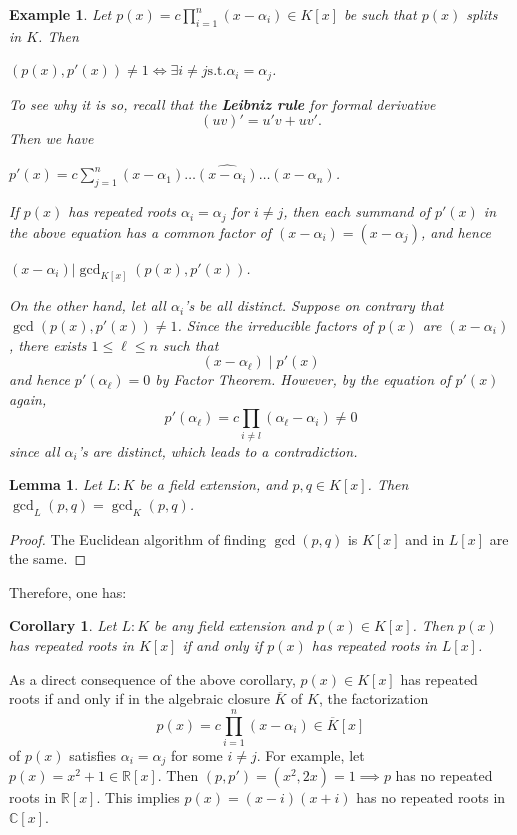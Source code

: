 \documentclass[11pt]{book}
\newtheorem{corollary}[theorem]{Corollary}
\newtheorem{example}[theorem]{Example}
\newtheorem{lemma}[theorem]{Lemma}
\begin{document}
\begin{example}
Let $p(x) = c \prod_{i=1}^n (x-\alpha_i) \in K[x]$ be such that $p(x)$ splits in $K$. Then 
\begin{center}
$(p(x), p'(x)) \neq 1 \iff \exists i \neq j \mathrm{ s.t. } \alpha_i = \alpha_j$.    
\end{center}
To see why it is so, recall that the {\bf Leibniz rule} for formal derivative
$$(uv)' = u'v + uv'.$$
Then we have
\begin{center}
    \(p'(x) = c \displaystyle \sum_{j=1}^n (x-\alpha_1)\dots \widehat{(x-\alpha_i)} \dots (x-\alpha_n)\).
\end{center}

If \(p(x)\) has repeated roots $\alpha_i = \alpha_j$ for $i \neq j$, then each summand of $p'(x)$ in the above equation has a common factor of $(x-\alpha_i) = (x-\alpha_j)$, and hence
\begin{center}
     \((x-\alpha_i) | \gcd_{K[x]}\left(p(x), p'(x)\right)\).
\end{center}

On the other hand, let all $\alpha_i$'s be all distinct. Suppose on contrary that $\gcd(p(x), p'(x)) \neq 1$. Since the irreducible factors of $p(x)$ are $(x-\alpha_i)$, there exists $1 \leq \ell \leq n$ such that
$$(x-\alpha_{\ell}) \mid p'(x)$$
and hence $p'(\alpha_{\ell}) = 0$ by Factor Theorem. However, by the equation of $p'(x)$ again, 
$$p'(\alpha_{\ell}) = c \prod_{i \neq l} (\alpha_{\ell} - \alpha_i) \neq 0$$
since all $\alpha_i$'s are distinct, which leads to a contradiction.
\end{example}


\begin{lemma}
    Let $L:K$ be a field extension, and $p, q \in K[x]$. Then $\gcd_L(p, q) = \gcd_K(p, q)$.
\end{lemma} 
\begin{proof}
    The Euclidean algorithm of finding $\gcd(p, q)$ is $K[x]$ and in $L[x]$ are the same.
\end{proof} 

Therefore, one has:
\begin{corollary}\label{cor-sepPolyFieldExt}
    Let $L:K$ be any field extension and $p(x) \in K[x]$. Then $p(x)$ has repeated roots in $K[x]$ if and only if $p(x)$ has repeated roots in $L[x]$.
\end{corollary}

As a direct consequence of the above corollary, $p(x) \in K[x]$ has repeated roots if and only if in the algebraic closure $\overline{K}$ of $K$, the factorization 
$$p(x) = c \prod_{i=1}^n(x - \alpha_i) \in \overline{K}[x]$$
of $p(x)$ satisfies $\alpha_i = \alpha_j$ for some 
$i \neq j$. For example, let $p(x) = x^2+1 \in \mathbb{R}[x]$. Then $(p, p') = (x^2, 2x) = 1 \implies p$ has no repeated roots in $\mathbb{R}[x]$. This implies $p(x) = (x-i)(x+i)$ has no repeated roots in $\mathbb{C}[x]$.
\end{document}

